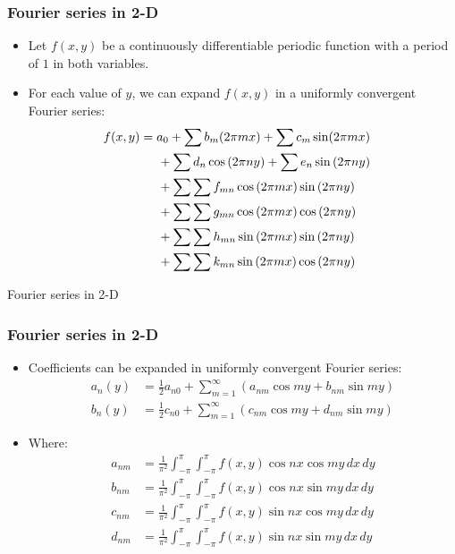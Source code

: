 \documentclass{beamer}
\begin{document}
\begin{frame}
\frametitle{Fourier series in 2-D }
\begin{itemize}

    \item Let $f(x, y)$ be a continuously differentiable periodic function with a period of $1$ in both variables.
    \item For each value of $y$, we can expand $f(x, y)$ in a uniformly convergent Fourier series:
    \begin{align*}
    f(x,y) = a_{0}+ \sum b_{m}(2\pi mx)+\sum c_{m}\sin(2\pi mx)\\
    &\hspace{-17em} +\sum d_{n}\cos\left(2\pi ny\right)+\sum e_{n}\sin\left(2\pi ny\right)\\
    &\hspace{-17em} +\sum\sum f_{mn}\cos\left(2\pi mx\right)\sin\left(2\pi ny\right)\\
    &\hspace{-17em} +\sum\sum g_{mn}\cos\left(2\pi mx\right)\cos\left(2\pi ny\right)\\
    &\hspace{-17em} +\sum\sum h_{mn}\sin\left(2\pi mx\right)\sin\left(2\pi ny\right)\\
    &\hspace{-17em} +\sum\sum k_{mn}\sin\left(2\pi mx\right)\cos\left(2\pi ny\right)
    \end{align*}
    
\end{itemize}
\end{frame}
\begin{frame}{Fourier series in 2-D}
    
\end{frame}
\begin{frame}
\frametitle{Fourier series in 2-D}
\begin{itemize}
     \item Coefficients can be expanded in uniformly convergent Fourier series:
    \begin{align*}
    a_n(y) &= \frac{1}{2} a_{n0} + \sum_{m=1}^{\infty} (a_{nm} \cos my + b_{nm} \sin my) \\
    b_n(y) &= \frac{1}{2} c_{n0} + \sum_{m=1}^{\infty} (c_{nm} \cos my + d_{nm} \sin my)
    \end{align*}
    \item Where:
    \begin{align*}
    a_{nm} &= \frac{1}{\pi^{2}}\int_{-\pi}^{\pi}\int_{-\pi}^{\pi}f(x,y)\cos nx\cos my\,dx\,dy\\
    b_{nm} &= \frac{1}{\pi^{2}}\int_{-\pi}^{\pi}\int_{-\pi}^{\pi}f(x,y)\cos nx\sin my\,dx\,dy \\
    c_{nm} &= \frac{1}{\pi^{2}}\int_{-\pi}^{\pi}\int_{-\pi}^{\pi}f(x,y)\sin nx\cos my\,dx\,dy \\
    d_{nm} &= \frac{1}{\pi^{2}}\int_{-\pi}^{\pi}\int_{-\pi}^{\pi}f(x,y)\sin nx\sin my\,dx\,dy \\
    \end{align*}
\end{itemize}
\end{frame}
\end{document}
